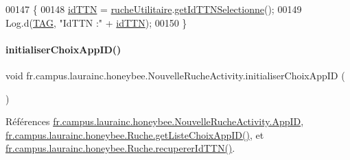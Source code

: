 \begin{DoxyCode}
00147     \{
00148         \hyperlink{classfr_1_1campus_1_1laurainc_1_1honeybee_1_1_nouvelle_ruche_activity_a0e39429b741638b151aec8960b76b0e1}{idTTN} = \hyperlink{classfr_1_1campus_1_1laurainc_1_1honeybee_1_1_nouvelle_ruche_activity_adad53c25187f84fd37af3d2de167529e}{rucheUtilitaire}.\hyperlink{classfr_1_1campus_1_1laurainc_1_1honeybee_1_1_ruche_a8c4c0db39c42733517035c4211e0ff95}{getIdTTNSelectionne}();
00149         Log.d(\hyperlink{classfr_1_1campus_1_1laurainc_1_1honeybee_1_1_nouvelle_ruche_activity_afa1372bcc0387e18df3877ebe605670d}{TAG}, \textcolor{stringliteral}{"IdTTN :"} + \hyperlink{classfr_1_1campus_1_1laurainc_1_1honeybee_1_1_nouvelle_ruche_activity_a0e39429b741638b151aec8960b76b0e1}{idTTN});
00150     \}
\end{DoxyCode}
\mbox{\label{classfr_1_1campus_1_1laurainc_1_1honeybee_1_1_nouvelle_ruche_activity_a25bf91899b217681bda733e7783d0bf9}} 
\paragraph{\texorpdfstring{initialiser\+Choix\+App\+I\+D()}{initialiserChoixAppID()}}
{\footnotesize\ttfamily void fr.\+campus.\+laurainc.\+honeybee.\+Nouvelle\+Ruche\+Activity.\+initialiser\+Choix\+App\+ID (\begin{DoxyParamCaption}{ }\end{DoxyParamCaption})\hspace{0.3cm}{\ttfamily [private]}}



Références \hyperlink{classfr_1_1campus_1_1laurainc_1_1honeybee_1_1_nouvelle_ruche_activity_a0ff20f2b7c524901d60c78d078999d85}{fr.\+campus.\+laurainc.\+honeybee.\+Nouvelle\+Ruche\+Activity.\+App\+ID}, \hyperlink{classfr_1_1campus_1_1laurainc_1_1honeybee_1_1_ruche_a08d58dc3ce2db9adc37903c9b2f08977}{fr.\+campus.\+laurainc.\+honeybee.\+Ruche.\+get\+Liste\+Choix\+App\+I\+D()}, et \hyperlink{classfr_1_1campus_1_1laurainc_1_1honeybee_1_1_ruche_a1113f3b4a527a801fdf50350667fd212}{fr.\+campus.\+laurainc.\+honeybee.\+Ruche.\+recuperer\+Id\+T\+T\+N()}.


